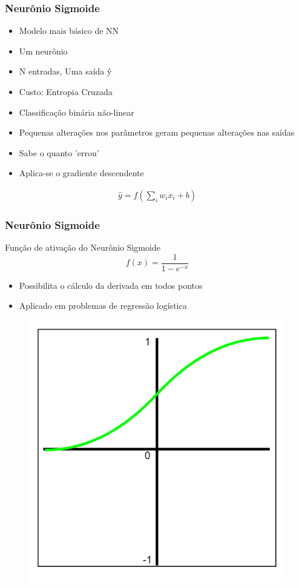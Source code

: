 \documentclass{beamer}
\begin{document}
\begin{frame}
	\frametitle{Neurônio Sigmoide}
	\begin{itemize}
		\item Modelo mais básico de NN
		\item Um neurônio
		\item N entradas, Uma saída ŷ
		\item Custo: Entropia Cruzada
		\item Classificação binária não-linear
		\item Pequenas alterações nos parâmetros geram pequenas alterações nas saídas
		\item Sabe o quanto 'errou'
		\item Aplica-se o gradiente descendente
	\end{itemize}
	
	\begin{gather*}
		\hat{y} = f( \sum_i w_i x_i + b)
	\end{gather*}
\end{frame}
\begin{frame}
	\frametitle{Neurônio Sigmoide}
	\begin{block}{Função de ativação do Neurônio Sigmoide}
		$$f(x) = \frac{1}{1-e^{-x}}$$
		\begin{itemize}
			\item Possibilita o cálculo da derivada em todos pontos
			\item Aplicado em problemas de regressão logística
		\end{itemize}
	\end{block}
	
\begin{figure}
	\centering
	\includegraphics[width=0.35\linewidth]{figures/sigmoid_function}
\end{figure}

	
\end{frame}
\end{document}
